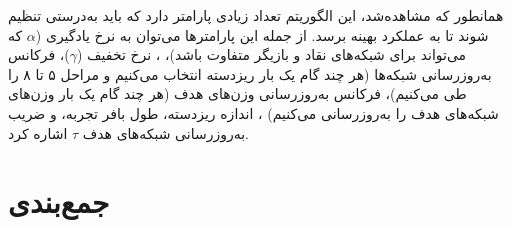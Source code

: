 همانطور که مشاهده‌شد، این الگوریتم تعداد زیادی پارامتر دارد که باید به‌درستی تنظیم شوند تا به عملکرد بهینه برسد.
از جمله این پارامتر‌ها می‌توان به نرخ یادگیری ($\alpha$ که می‌تواند برای شبکه‌های نقاد و بازیگر متفاوت باشد)،
، نرخ تخفیف ($\gamma$)،
فرکانس به‌روزرسانی شبکه‌ها (هر چند گام یک بار ریزدسته انتخاب می‌کنیم و مراحل ۵ تا ۸ را طی می‌کنیم)،
فرکانس به‌روزرسانی وزن‌های هدف (هر چند گام یک بار وزن‌های شبکه‌های هدف را به‌روزرسانی می‌کنیم)
 ، اندازه ریزدسته، طول بافر تجربه، و ضریب به‌روزرسانی شبکه‌های هدف $\tau$
  اشاره کرد.
\section{جمع‌بندی}




